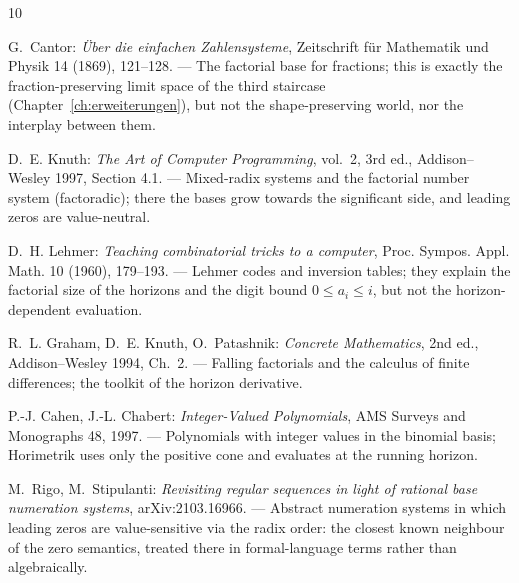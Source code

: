 \begingroup
\makeatletter
\renewcommand{\chapter}[2]{}%
\renewcommand{\@mkboth}[2]{}%
\makeatother
\begin{thebibliography}{10}

 G.~Cantor: \emph{Über die einfachen Zahlensysteme},
Zeitschrift für Mathematik und Physik 14 (1869), 121--128.
--- The factorial base for fractions; this is exactly the
fraction-preserving limit space of the third staircase
(Chapter~\ref{ch:erweiterungen}), but not the shape-preserving
world, nor the interplay between them.

 D.~E. Knuth: \emph{The Art of Computer Programming},
vol.~2, 3rd ed., Addison--Wesley 1997, Section 4.1.
--- Mixed-radix systems and the factorial number system
(factoradic); there the bases grow towards the significant side,
and leading zeros are value-neutral.

 D.~H. Lehmer: \emph{Teaching combinatorial tricks
to a computer}, Proc. Sympos. Appl. Math. 10 (1960), 179--193.
--- Lehmer codes and inversion tables; they explain the factorial
size of the horizons and the digit bound $0\le a_i\le i$, but not
the horizon-dependent evaluation.

 R.~L. Graham, D.~E. Knuth, O.~Patashnik:
\emph{Concrete Mathematics}, 2nd ed., Addison--Wesley 1994, Ch.~2.
--- Falling factorials and the calculus of finite differences; the
toolkit of the horizon derivative.

 P.-J. Cahen, J.-L. Chabert: \emph{Integer-Valued
Polynomials}, AMS Surveys and Monographs 48, 1997.
--- Polynomials with integer values in the binomial basis;
Horimetrik uses only the positive cone and evaluates at the
running horizon.

 M.~Rigo, M.~Stipulanti: \emph{Revisiting regular
sequences in light of rational base numeration systems},
arXiv:2103.16966.
--- Abstract numeration systems in which leading zeros are
value-sensitive via the radix order: the closest known neighbour
of the zero semantics, treated there in formal-language terms
rather than algebraically.


\end{thebibliography}

